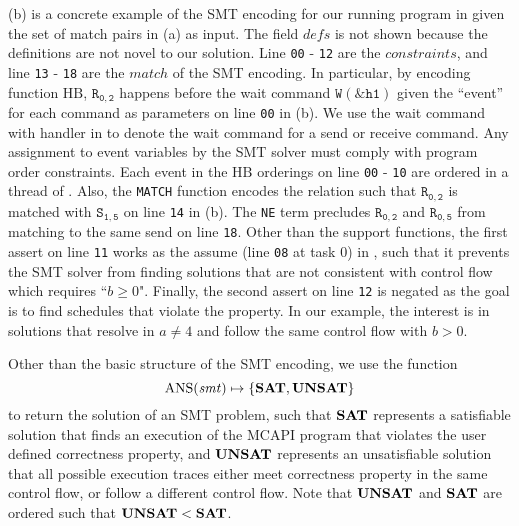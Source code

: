 (b) is a concrete example of the SMT encoding for our running program in  given the set of match pairs in (a) as input. The field $\mathit{defs}$ is not shown because the definitions are not novel to our solution. Line \texttt{00} - \texttt{12} are the $\mathit{constraints}$, and line \texttt{13} - \texttt{18} are the $\mathit{match}$ of the SMT encoding. In particular, by encoding function $\mathrm{HB}$, $\mathtt{R_{0,2}}$ happens before the wait command $\mathtt{W(\&h1)}$ given the ``event'' for each command as parameters on line \texttt{00} in (b). We use the wait command with handler in  to denote the wait command for a send or receive command. Any assignment to event variables by the SMT solver must comply with program order constraints. Each event in the $\mathrm{HB}$ orderings on line \texttt{00} - \texttt{10} are ordered in a thread of . Also, the \texttt{MATCH} function encodes the relation such that $\mathtt{R_{0,2}}$ is matched with $\mathtt{S_{1,5}}$ on line \texttt{14} in (b). The \texttt{NE} term precludes $\mathtt{R_{0,2}}$ and $\mathtt{R_{0,5}}$ from matching to the same send on line \texttt{18}. Other than the support functions, the first assert on line \texttt{11} works as the assume (line \texttt{08} at task 0) in , such that it prevents the SMT solver from finding solutions that are not consistent with control flow which requires ``$b \ge 0$". Finally, the second assert on line \texttt{12} is negated as the goal is to find schedules that violate the property. In our example, the interest is in solutions that resolve in $a \neq 4$ and follow the same control flow with $b > 0$.

Other than the basic structure of the SMT encoding, we use the function
\[\mathrm{ANS}(\mathit{smt}) \mapsto \{\mathrm{\textbf{SAT}},\mathrm{\textbf{UNSAT}}\} \]
to return the solution of an SMT problem, such that $\mathrm{\textbf{SAT}}$ represents a satisfiable solution that finds an execution of the MCAPI program that violates the user defined correctness property, and $\mathrm{\textbf{UNSAT}}$ represents an unsatisfiable solution that all possible execution traces either meet correctness property in the same control flow, or follow a different control flow. Note that $\mathrm{\textbf{UNSAT}}$ and $\mathrm{\textbf{SAT}}$ are ordered such that $\mathrm{\textbf{UNSAT}} < \mathrm{\textbf{SAT}}$.


